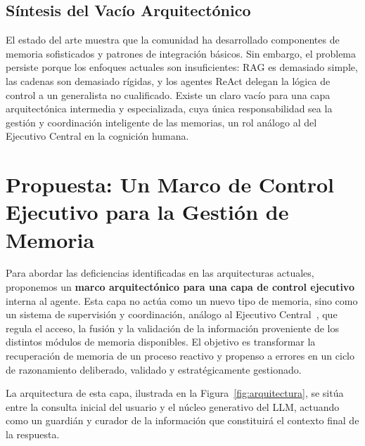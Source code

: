 \documentclass[conference]{IEEEtran}
\begin{document}
\subsection{Síntesis del Vacío Arquitectónico}
El estado del arte muestra que la comunidad ha desarrollado componentes de memoria sofisticados y patrones de integración básicos. Sin embargo, el problema persiste porque los enfoques actuales son insuficientes: RAG es demasiado simple, las cadenas son demasiado rígidas, y los agentes ReAct delegan la lógica de control a un generalista no cualificado. Existe un claro vacío para una capa arquitectónica intermedia y especializada, cuya única responsabilidad sea la gestión y coordinación inteligente de las memorias, un rol análogo al del Ejecutivo Central en la cognición humana.

\section{Propuesta: Un Marco de Control Ejecutivo para la Gestión de Memoria}

Para abordar las deficiencias identificadas en las arquitecturas actuales, proponemos un \textbf{marco arquitectónico para una capa de control ejecutivo} interna al agente. Esta capa no actúa como un nuevo tipo de memoria, sino como un sistema de supervisión y coordinación, análogo al Ejecutivo Central~\cite{baddeley1974working}, que regula el acceso, la fusión y la validación de la información proveniente de los distintos módulos de memoria disponibles. El objetivo es transformar la recuperación de memoria de un proceso reactivo y propenso a errores en un ciclo de razonamiento deliberado, validado y estratégicamente gestionado.

La arquitectura de esta capa, ilustrada en la Figura~\ref{fig:arquitectura}, se sitúa entre la consulta inicial del usuario y el núcleo generativo del LLM, actuando como un guardián y curador de la información que constituirá el contexto final de la respuesta.
\end{document}
